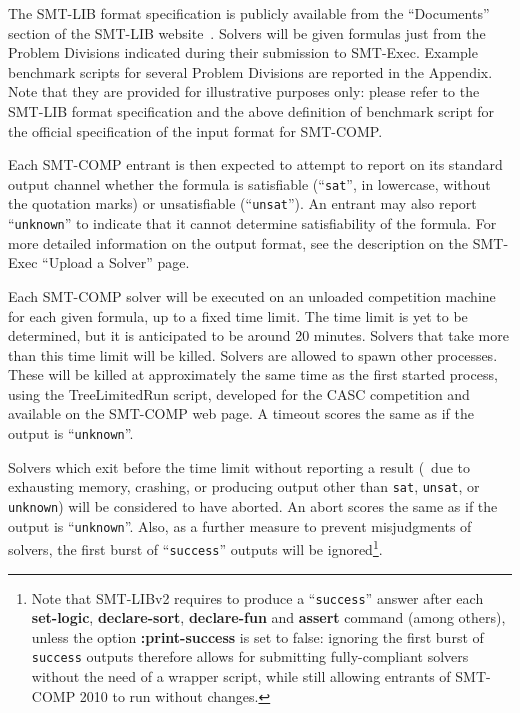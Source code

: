 \documentclass[12pt]{article}
\newcommand{\akey}[1]{\textbf{#1}}
\begin{document}
\noindent The SMT-LIB format specification is publicly
available from the ``Documents'' section of the SMT-LIB
website~\cite{SMT-LIB}.  Solvers will be given formulas just from the
Problem Divisions indicated during their submission to SMT-Exec.
Example benchmark scripts for several Problem Divisions are reported in the Appendix.
Note that they are provided for illustrative purposes only: 
please refer to the SMT-LIB format specification 
and the above definition of benchmark script for the official specification 
of the input format for SMT-COMP.

\medskip
Each SMT-COMP entrant is then expected to attempt to report on its
standard output channel whether the formula is satisfiable
(``\texttt{sat}'', in lowercase, without the quotation marks) or unsatisfiable
(``\texttt{unsat}'').  An entrant may also report ``\texttt{unknown}''
to indicate that it cannot determine satisfiability of the formula.
For more detailed information on the output format, see the
description on the SMT-Exec ``Upload a Solver'' page.

Each SMT-COMP solver will be executed on an
unloaded competition machine for each given formula, up to a fixed
time limit.  The time limit is yet to be determined, but it is
anticipated to be around 20 minutes.  Solvers that take more than this
time limit will be killed.  Solvers are allowed to spawn other
processes.  These will be killed at approximately the same time as the
first started process, using the TreeLimitedRun script, developed for
the CASC competition and available on the SMT-COMP web page.  A
timeout scores the same as if the output is ``\texttt{unknown}''.

Solvers which exit before the time
limit without reporting a result (\ie\ due to exhausting memory, crashing,
or producing output other than \texttt{sat}, \texttt{unsat}, or
\texttt{unknown})
will be considered to have aborted. 
An abort scores the same as if the output is ``\texttt{unknown}''. 
Also, as a further measure to prevent misjudgments of solvers,
the first burst of  ``\texttt{success}'' outputs will be 
ignored\footnote{
Note that SMT-LIBv2 requires to produce a ``\texttt{success}'' answer
after each \akey{set-logic}, \akey{declare-sort}, \akey{declare-fun} and
\akey{assert} command (among others), unless the option
\akey{:print-success} is set to false: ignoring the first burst of
\texttt{success} outputs therefore allows for submitting fully-compliant
solvers without the need of a wrapper script, while still allowing entrants
of SMT-COMP 2010 to run without changes.}.
\end{document}
